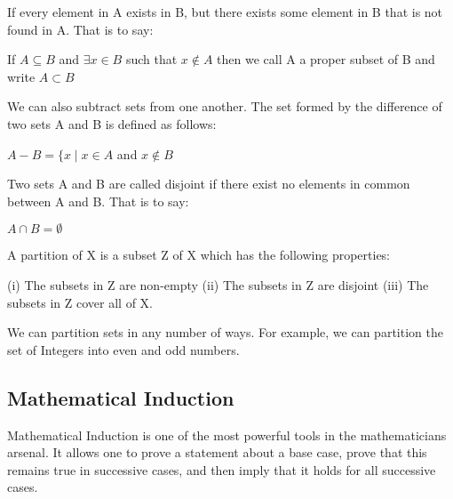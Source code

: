 If every element in A exists in B, but there exists some element in B that is not found in A. That is to say: \newline

\begin{definition}
\begin{center}
If $A \subseteq B$ and $\exists x \in B$ such that $x \not\in A$ then we call A a proper subset of B and write $A \subset B$
\end{center}
\end{definition}

We can also subtract sets from one another. The set formed by the difference of two sets A and B is defined as follows:

\begin{definition}
\begin{center}
$A-B = \{ x \mid x \in A$ and $x \not\in B$
\end{center}
\end{definition}

Two sets A and B are called disjoint if there exist no elements in common between A and B. That is to say:

\begin{definition}
\begin{center}
$A \cap B = \emptyset $
\end{center}
\end{definition}

A partition of X is a subset Z of X which has the following properties: \newline

(i)   The subsets in Z are non-empty \newline
(ii)  The subsets in Z are disjoint \newline
(iii) The subsets in Z cover all of X.\newline

We can partition sets in any number of ways. For example, we can partition the set of Integers into even and odd numbers.

\subsection{Mathematical Induction}
Mathematical Induction is one of the most powerful tools in the mathematicians arsenal. It allows one to prove a statement about a base case, prove that this remains true in successive cases, and then imply that it holds for all successive cases.


